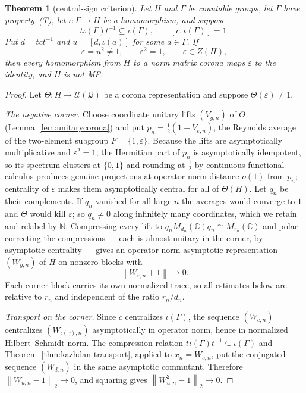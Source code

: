 \documentclass[11pt]{amsart}
\newcommand{\leanverified}[2]{\ignorespaces}
\newtheorem{theorem}{Theorem}[section]
\theoremstyle{definition}
\theoremstyle{remark}
\theoremstyle{plain}
\newcommand{\C}{\mathbb C}
\newcommand{\N}{\mathbb N}
\newcommand{\U}{\mathcal U}
\newcommand{\opnorm}[1]{\left\lVert #1\right\rVert}
\newcommand{\hsnorm}[1]{\left\lVert #1\right\rVert_{2}}
\begin{document}
\begin{theorem}[central-sign criterion]\label{thm:sign-criterion}
Let $H$ and $\Gamma$ be countable groups, let $\Gamma$ have
property~\textup{(T)}, let
$\iota\colon\Gamma\to H$ be a homomorphism, and suppose
\[
 t\iota(\Gamma)t^{-1}\subseteq\iota(\Gamma),
 \qquad [c,\iota(\Gamma)]=1.
\]
Put $d=tct^{-1}$ and $u=[d,\iota(a)]$ for some $a\in\Gamma$.
If
\[
 \varepsilon=u^2\ne1,\qquad \varepsilon^2=1,\qquad \varepsilon\in Z(H),
\]
then every homomorphism from $H$ to a norm matrix corona maps
$\varepsilon$ to the identity, and $H$ is not MF.
\leanverified{Sofic/KazhdanSignCriterion}{GroupApproximation.KazhdanCompressionCore.manuscriptCentralSignCriterion}
\end{theorem}

\begin{proof}
Let $\Theta\colon H\to\U(\mathcal Q)$ be a corona representation and
suppose $\Theta(\varepsilon)\ne1$.

\emph{The negative corner.}  Choose coordinate unitary lifts
$(V_{g,n})$ of $\Theta$ (Lemma~\ref{lem:unitarycorona}) and put
$p_n=\tfrac12(1+V_{\varepsilon,n})$, the Reynolds average of the
two-element subgroup $F=\{1,\varepsilon\}$.  Because the lifts are
asymptotically multiplicative and $\varepsilon^2=1$, the Hermitian
part of $p_n$ is asymptotically idempotent, so its spectrum clusters
at $\{0,1\}$ and rounding at $\tfrac12$ by continuous functional
calculus produces genuine projections at operator-norm distance $o(1)$
from $p_n$; centrality of $\varepsilon$ makes them asymptotically
central for all of $\Theta(H)$.  Let $q_n$ be their complements.  If
$q_n$ vanished for all large $n$ the averages would converge to $1$
and $\Theta$ would kill $\varepsilon$; so $q_n\ne0$ along infinitely
many coordinates, which we retain and relabel by $\N$.  Compressing
every lift to $q_nM_{d_n}(\C)q_n\cong M_{r_n}(\C)$ and polar-correcting
the compressions --- each is almost unitary in the corner, by
asymptotic centrality --- gives an operator-norm asymptotic
representation $(W_{g,n})$ of $H$ on nonzero blocks with
\[
 \opnorm{W_{\varepsilon,n}+1}\longrightarrow0 .
\]
Each corner block carries its own normalized trace, so all estimates
below are relative to $r_n$ and independent of the ratio $r_n/d_n$.

\emph{Transport on the corner.}  Since $c$ centralizes
$\iota(\Gamma)$, the sequence $(W_{c,n})$ centralizes
$(W_{\iota(\gamma),n})$ asymptotically in operator norm, hence in
normalized Hilbert--Schmidt norm.  The compression relation
$t\iota(\Gamma)t^{-1}\subseteq\iota(\Gamma)$ and
Theorem~\ref{thm:kazhdan-transport}, applied to $x_n=W_{c,n}$, put the
conjugated sequence $(W_{d,n})$ in the same asymptotic commutant.
Therefore $\hsnorm{W_{u,n}-1}\to0$, and squaring gives
$\hsnorm{W_{u,n}^2-1}\to0$.


\end{proof}
\end{document}
